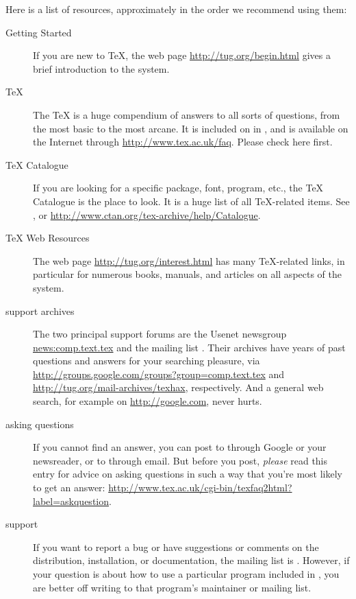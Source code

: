\documentclass{article}
\begin{document}
Here is a list of resources, approximately in the order we recommend
using them:

\begin{description}
\item [Getting Started] If you are new to \TeX, the web page
\url{http://tug.org/begin.html} gives a brief introduction to the system.

\item [\TeX{} ] The \TeX{}  is a huge compendium of
answers to all sorts of questions, from the most basic to the most
arcane.  It is included on \TL{} in , and is
available on the Internet through \url{http://www.tex.ac.uk/faq}.
Please check here first.

\item [\TeX{} Catalogue] If you are looking for a specific package,
font, program, etc., the \TeX{} Catalogue is the place to look.  It is a
huge list of all \TeX{}-related items.  See
, or
\url{http://www.ctan.org/tex-archive/help/Catalogue}.

\item [\TeX{} Web Resources] The web page
\url{http://tug.org/interest.html} has many \TeX{}-related links, in
particular for numerous books, manuals, and articles on all aspects of
the system.

\item [support archives] The two principal support forums are the
Usenet newsgroup \url{news:comp.text.tex} and the mailing list
.  Their archives have years of past
questions and answers for your searching pleasure, via
\url{http://groups.google.com/groups?group=comp.text.tex} and
\url{http://tug.org/mail-archives/texhax}, respectively.  And a general web
search, for example on \url{http://google.com}, never hurts.

\item [asking questions] If you cannot find an answer, you can post to
 through Google or your newsreader, or to
 through email.  But before you post,
\emph{please} read this  entry for advice on asking questions
in such a way that you're most likely to get an answer:
\url{http://www.tex.ac.uk/cgi-bin/texfaq2html?label=askquestion}.

\item [\TL{} support] If you want to report a bug or have
suggestions or comments on the \TL{} distribution, installation, or
documentation, the mailing list is .  However,
if your question is about how to use a particular program included in
\TL{}, you are better off writing to that program's maintainer or
mailing list.

\end{description}
\end{document}
